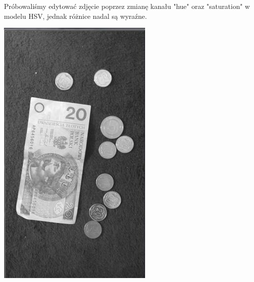 \documentclass[12pt]{article}
\begin{document}
Próbowaliśmy edytować zdjęcie poprzez zmianę kanału "hue" oraz "saturation" w modelu HSV, jednak różnice nadal są wyraźne.

\includegraphics[scale=0.8]{HS}
\end{document}
